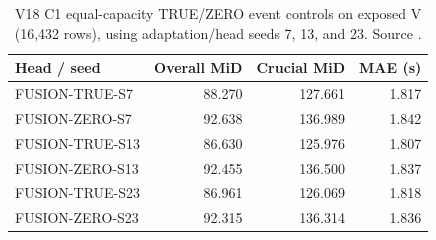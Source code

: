 \begin{table}[tbp]
\centering\small
\caption{V18 C1 equal-capacity TRUE/ZERO event controls on exposed V (16,432 rows), using adaptation/head seeds 7, 13, and 23. Source .}
\label{tab:late-fusion}
\begin{tabular}{lrrr}
\toprule
\textbf{Head / seed} & \textbf{Overall MiD} & \textbf{Crucial MiD} & \textbf{MAE (s)} \\
\midrule
FUSION-TRUE-S7 & 88.270 & 127.661 & 1.817 \\
FUSION-ZERO-S7 & 92.638 & 136.989 & 1.842 \\
FUSION-TRUE-S13 & 86.630 & 125.976 & 1.807 \\
FUSION-ZERO-S13 & 92.455 & 136.500 & 1.837 \\
FUSION-TRUE-S23 & 86.961 & 126.069 & 1.818 \\
FUSION-ZERO-S23 & 92.315 & 136.314 & 1.836 \\
\bottomrule
\end{tabular}
\end{table}